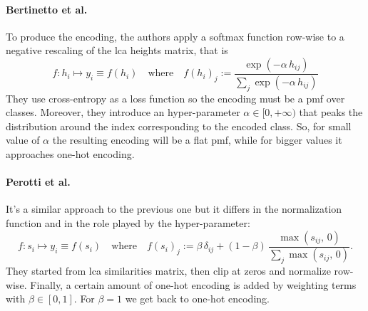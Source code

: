 \paragraph{Bertinetto et al.~\cite{MakingBetterMBertin2019}}\label{par:encoding-mbm} To produce the encoding, the authors apply a softmax function row-wise to a negative rescaling of the \acrshort{lca} heights matrix, that is
\begin{equation}
  f : h_i \mapsto y_i \equiv f(h_i)
  \quad \textrm{where} \quad
  f (h_i)_j := \frac{\exp \left({-\alpha \, h_{ij}}\right)}
  {\sum_j \exp\left({-\alpha \, h_{ij}}\right)}
  \label{eq:mbm-hierarchical-encoding}
\end{equation}
They use cross-entropy as a loss function so the encoding must be a \acrshort{pmf} over classes.
Moreover, they introduce an hyper-parameter $\alpha \in [0, +\infty)$ that peaks the distribution around the index corresponding to the encoded class. So, for small value of $\alpha$ the resulting encoding will be a flat \acrshort{pmf}, while for bigger values it approaches one-hot encoding.

\paragraph{Perotti et al.~\cite{BeyondOneHotPerott2023}}\label{par:encoding-b3p} It's a similar approach to the previous one but it differs in the normalization function and in the role played by the hyper-parameter:
\begin{equation}
  f :  s_i \mapsto y_i \equiv f(s_i)
  \quad \textrm{where} \quad
  f (s_i)_j := \beta \, \delta_{ij} +
  \left(1 - \beta \right) \, \frac{\max \left(s_{ij},\,0\right)}
  {\sum_j \max \left(s_{ij},\,0\right)}.
  \label{eq:b3p-hierarchical-encoding}
\end{equation}
They started from \acrshort{lca} similarities matrix, then clip at zeros and normalize row-wise.
Finally, a certain amount of one-hot encoding is added by weighting terms with $\beta \in [0, 1]$. For $\beta = 1$ we get back to one-hot encoding.

